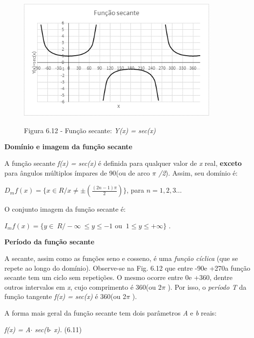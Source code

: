 \begin{figure}[H]
    \begin{Center}
        \includegraphics[width=3.95in,height=2.43in]{capitulos/trigonometria_e_funcoes_trigonometricas/media/image41.png}

        Figura 6.12 - Função secante: \textit{Y(x) = sec(x)}
    \end{Center}
\end{figure}

\textbf{Domínio e imagem da função secante}

A função secante \textit{f(x) = sec(x) }é definida para qualquer valor de \textit{x} real, \textbf{exceto} para ângulos múltiplos ímpares de 90\degree  (ou de arco \textit{$ \pi $ /2}). Assim, seu domínio é:

$D_{m}f(x) = \{x \in R / x \neq \pm (\frac{(2n-1)\pi}{2})\}$, para $n=1,2,3...$

O conjunto imagem da função secante é:

   $I_{m}f \left( x \right) = \{ y \in ~R /  - \infty ~ \leq  y  \leq  -1$  ou $~ 1  \leq  y  \leq  +\infty \}$   .

\textbf{Período da função secante}

A secante, assim como as funções seno e cosseno, é uma \textit{função cíclica} (que se repete ao longo do domínio). Observe-se na Fig. 6.12 que entre -90\degree  e +270\degree a função secante tem um ciclo sem repetições. O mesmo ocorre entre 0\degree e +360\degree, dentre outros intervalos em \textit{x}, cujo comprimento é 360\degree (ou  2$ \pi $ ). Por isso, o \textit{período T} da função tangente  \textit{f(x) = sec(x) } é 360\degree (ou  2$ \pi $ ).

A forma mais geral da função secante tem dois parâmetros \textit{A }e\textit{ b} reais:

\textit{f(x) = A$ \cdot $ sec(b$ \cdot $ x).  \tab \tab \tab \tab \tab   }(6.11)


